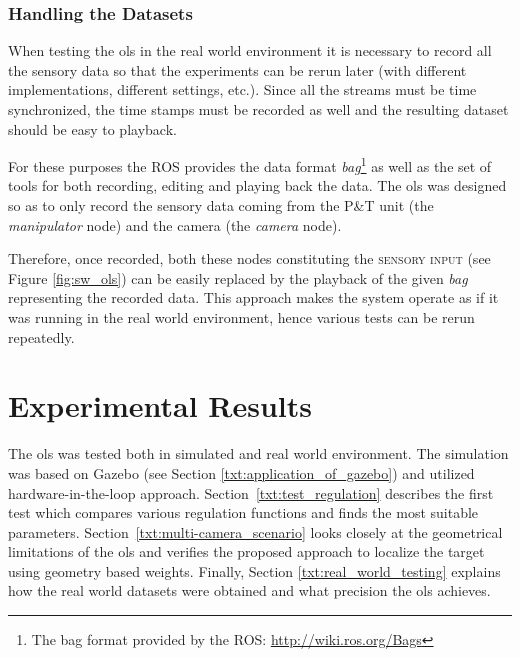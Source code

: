 \subsection{Handling the Datasets} \label{txt:handling_datasets}

When testing the \gls{ols} in the real world environment it is necessary to record all the sensory data so that the experiments can be rerun later (with different implementations, different settings, etc.). Since all the streams must be time synchronized, the time stamps must be recorded as well and the resulting dataset should be easy to playback.

For these purposes the ROS provides the data format \textit{bag}\footnote{The bag format provided by the ROS: \url{http://wiki.ros.org/Bags}} as well as the set of tools for both recording, editing and playing back the data. The \gls{ols} was designed so as to only record the sensory data coming from the P\&T unit (the \textit{manipulator} node) and the camera (the \textit{camera} node). 

Therefore, once recorded, both these nodes constituting the \textsc{sensory input} (see Figure \ref{fig:sw_ols}) can be easily replaced by the playback of the given \textit{bag} representing the recorded data. This approach makes the system operate as if it was running in the real world environment, hence various tests can be rerun repeatedly.

\chapter{Experimental Results} \label{txt:experimental_results}

The \gls{ols} was tested both in simulated and real world environment. The simulation was based on Gazebo (see Section \ref{txt:application_of_gazebo}) and utilized hardware-in-the-loop approach. Section~\ref{txt:test_regulation} describes the first test which compares various regulation functions and finds the most suitable parameters. Section~\ref{txt:multi-camera_scenario} looks closely at the geometrical limitations of the \gls{ols} and verifies the proposed approach to localize the target using geometry based weights. Finally, Section \ref{txt:real_world_testing} explains how the real world datasets were obtained and what precision the \gls{ols} achieves.

